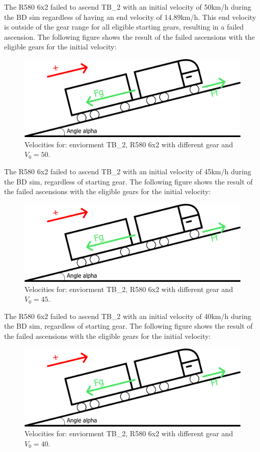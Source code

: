 \documentclass[noprint]{uit-thesis}
\begin{document}
The R580 6x2 failed to ascend TB\_2 with an initial velocity of 50km/h during the BD sim regardless of having an end velocity of 14.89km/h. This end velocity is outside of the gear range for all eligible starting gears, resulting in a failed ascension. The following figure shows the result of the failed ascensions with the eligible gears for the initial velocity:
\begin{figure}[H]
\includegraphics[width=\textwidth, height=0.45\textheight]{photo/freeBodyDiagram.png}
\caption{Velocities for: enviorment TB\_2, R580 6x2 with different gear and $V_0 = 50$.}
\label{fig:TB2_6x2_50}
\end{figure}

The R580 6x2 failed to ascend TB\_2 with an initial velocity of 45km/h during the BD sim, regardless of starting gear. The following figure shows the result of the failed ascensions with the eligible gears for the initial velocity:
\begin{figure}[H]
\includegraphics[width=\textwidth, height=0.37\textheight]{photo/freeBodyDiagram.png}
\caption{Velocities for: enviorment TB\_2, R580 6x2 with different gear and $V_0 = 45$.}
\label{fig:TB2_6x2_45}
\end{figure}

The R580 6x2 failed to ascend TB\_2 with an initial velocity of 40km/h during the BD sim, regardless of starting gear. The following figure shows the result of the failed ascensions with the eligible gears for the initial velocity:
\begin{figure}[H]
\includegraphics[width=\textwidth, height=0.37\textheight]{photo/freeBodyDiagram.png}
\caption{Velocities for: enviorment TB\_2, R580 6x2 with different gear and $V_0 = 40$.}
\label{fig:TB2_6x2_40}
\end{figure}
 
\end{document}

